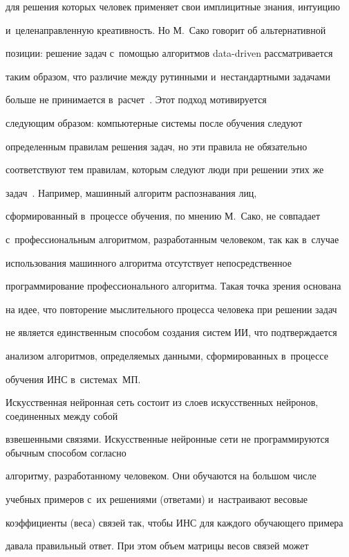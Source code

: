 для решения которых человек применяет свои имплицитные знания, интуицию 


и~целенаправленную креативность. Но М.~Сако говорит об альтернативной 


позиции: решение задач с~помощью алгоритмов data-driven рассматривается 


таким образом, что различие между рутинными и~нестандартными задачами 


больше не принимается в~расчет~\cite{2-eg}. Этот подход мотивируется 


следующим образом: компьютерные системы после обучения следуют 


определенным правилам решения задач, но эти правила не обязательно 


соответствуют тем правилам, которым следуют люди при решении этих же 


задач~\cite{6-eg}. Например, машинный алгоритм распознавания лиц, 


сформированный в~процессе обучения, по мнению М.~Сако, не совпадает 


с~профессиональным алгоритмом, разработанным человеком, так как в~случае 


использования машинного алгоритма отсутствует непосредственное 


программирование профессионального алгоритма. Такая точка зрения основана 


на идее, что повторение мыслительного процесса человека при решении задач 


не является единственным способом создания систем ИИ, что подтверждается 


анализом алгоритмов, определяемых данными, сформированных в~процессе 


обучения ИНС в~системах~МП.


  


  Искусственная нейронная сеть состоит из слоев искусственных нейронов, соединенных между собой 


взвешенными связями. Искусственные нейронные сети не программируются обычным способом согласно 


алгоритму, разработанному человеком. Они обучаются на большом числе 


учебных примеров с~их решениями (ответами) и~настраивают весовые 


коэффициенты (веса) связей так, чтобы ИНС для каждого обучающего примера 


давала правильный ответ. При этом объем матрицы весов связей может 


